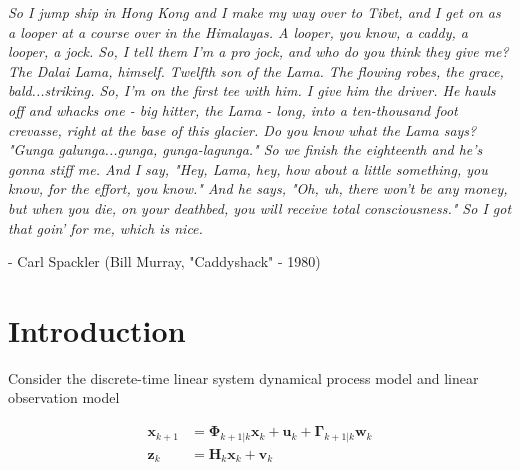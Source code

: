 \documentclass[12pt]{article}
\begin{document}
\clearpage



\begin{adjustwidth}{1in}{1in}
    \vspace*{\fill}
    
    \textit{
        So I jump ship in Hong Kong and I make my way over to Tibet, and I get on as a
        looper at a course over in the Himalayas.
        A looper, you know, a caddy, a looper, a jock. So, I tell them I'm a pro jock,
        and who do you think they give me? The Dalai Lama, himself. Twelfth son of the Lama.
        The flowing robes, the grace, bald...striking. So, I'm on the first tee with him.
        I give him the driver. He hauls off and whacks one - big hitter, the Lama - long,
        into a ten-thousand foot crevasse, right at the base of this glacier.
        Do you know what the Lama says? "Gunga galunga...gunga, gunga-lagunga."
        So we finish the eighteenth and he's gonna stiff me. And I say, "Hey, Lama, hey,
        how about a little something, you know, for the effort, you know."
        And he says, "Oh, uh, there won't be any money, but when you die, on your deathbed,
        you will receive total consciousness." So I got that goin' for me, which is nice.
    }
    
    - Carl Spackler (Bill Murray, "Caddyshack" - 1980)
    
    \vfill
\end{adjustwidth}



\clearpage



\tableofcontents



\clearpage



\section{Introduction}

Consider the discrete-time linear system dynamical process model and linear observation model

\begin{equation*}
    \begin{aligned}
        \mathbf{x}_{k+1} &= \mathbf{\Phi}_{k+1|k} \mathbf{x}_k + \mathbf{u}_k + \mathbf{\Gamma}_{k+1|k} \mathbf{w}_k \\
        \mathbf{z}_k &= \mathbf{H}_k \mathbf{x}_k + \mathbf{v}_k
    \end{aligned}
\end{equation*}
\end{document}
